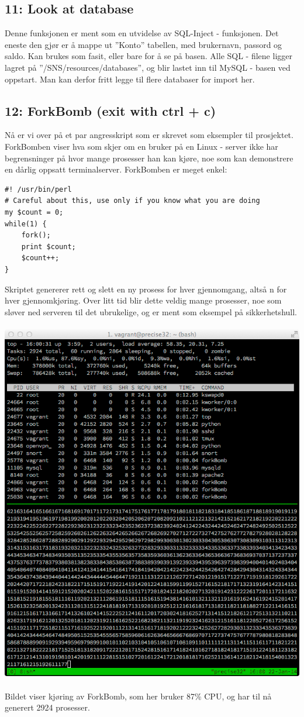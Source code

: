 \documentclass{article}
\begin{document}
\subsection{11: Look at database}
Denne funksjonen er ment som en utvidelse av SQL-Inject - funksjonen. Det eneste den gjør er å mappe ut ''Konto'' tabellen, med brukernavn, passord og saldo. Kan brukes som fasit, eller bare for å se på basen. Alle SQL - filene ligger lagret på ''/SNS/resources/databases'', og blir lastet inn til MySQL - basen ved oppstart. Man kan derfor fritt legge til flere databaser for import her.
\subsection{12: ForkBomb (exit with ctrl + c)}
Nå er vi over på et par angresskript som er skrevet som eksempler til prosjektet. ForkBomben viser hva som skjer om en bruker på en Linux - server ikke har begrensninger på hvor mange prosesser han kan kjøre, noe som kan demonstrere en dårlig oppsatt terminalserver. ForkBomben er meget enkel: 
\begin{lstlisting}
#! /usr/bin/perl
# Careful about this, use only if you know what you are doing
my $count = 0;
while(1) {
    fork();
    print $count;
    $count++;
}
\end{lstlisting}
Skriptet genererer rett og slett en ny prosess for hver gjennomgang, altså n for hver gjennomkjøring. Over litt tid blir dette veldig mange prosesser, noe som sløver ned serveren til det ubrukelige, og er ment som eksempel på sikkerhetshull. 
\\
\\
\includegraphics[scale = 0.6]{pictures/forkbomb.png}
\\
\\
Bildet viser kjøring av ForkBomb, som her bruker 87\% CPU, og har til nå generert 2924 prosesser. 
\end{document}
